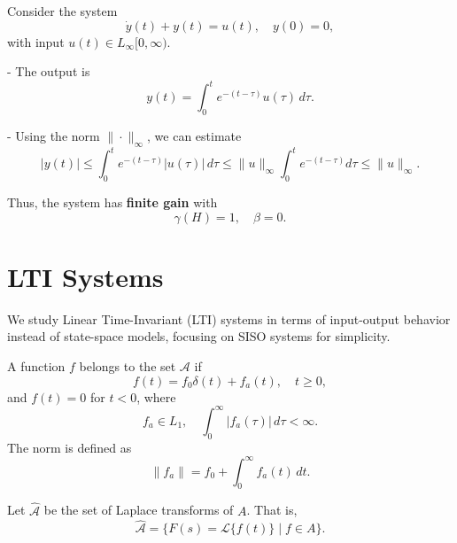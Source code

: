 \begin{example}
Consider the system
\begin{equation}
\dot{y}(t) + y(t) = u(t), \quad y(0)=0,
\end{equation}
with input \(u(t) \in L_\infty[0,\infty)\).  

- The output is 
\begin{equation}
y(t) = \int_0^t e^{-(t-\tau)} u(\tau) \, d\tau.
\end{equation}  

- Using the norm \(\| \cdot \|_\infty\), we can estimate
\begin{equation}
|y(t)| \le \int_0^t e^{-(t-\tau)} |u(\tau)| \, d\tau \le \| u \|_\infty \int_0^t e^{-(t-\tau)} d\tau \le \| u \|_\infty.
\end{equation}

Thus, the system has \textbf{finite gain} with 
\begin{equation}
\gamma(H) = 1, \quad \beta = 0.
\end{equation}
\end{example}

\section{LTI Systems}

We study Linear Time-Invariant (LTI) systems in terms of input-output behavior instead of state-space models, focusing on SISO systems for simplicity.  

\begin{definition}[Set $A$]  
A function $f$ belongs to the set $\mathcal{A}$ if
\begin{equation}
f(t) = f_0\delta(t) + f_a(t), \quad t \geq 0,
\end{equation}
and $f(t) = 0$ for $t < 0$, where
\begin{equation}
f_a \in L_1, \quad \int_0^\infty |f_a(\tau)| \, d\tau < \infty.
\end{equation}
The norm is defined as
\begin{equation}
\|f_a\| = f_0 + \int_0^\infty f_a(t)\, dt.
\end{equation}
\end{definition}

\begin{definition}  
Let $\hat{\mathcal{A}}$ be the set of Laplace transforms of $A$. That is,
\begin{equation}
\hat{\mathcal{A}} = \{ F(s) = \mathcal{L}\{f(t)\} \mid f \in A \}.
\end{equation}
\end{definition}

